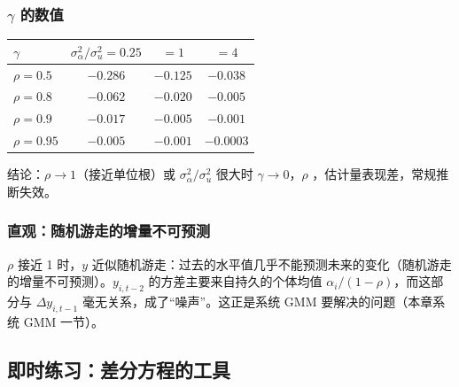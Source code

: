\subsubsection{\texorpdfstring{$\gamma$}{gamma} 的数值}

\begin{center}
\begin{minipage}{\linewidth}\centering\small
{}\label{tab:U12a-gamma}
\begin{tabular}{lccc}
\toprule
$\gamma$ & $\sigma_\alpha^2/\sigma_u^2=0.25$ & $=1$ & $=4$\\
\midrule
$\rho=0.5$  & $-0.286$ & $-0.125$ & $-0.038$\\
$\rho=0.8$  & $-0.062$ & $-0.020$ & $-0.005$\\
$\rho=0.9$  & $-0.017$ & $-0.005$ & $-0.001$\\
$\rho=0.95$ & $-0.005$ & $-0.001$ & $-0.0003$\\
\bottomrule
\end{tabular}
\end{minipage}
\end{center}

结论：$\rho\to1$（接近单位根）或 $\sigma_\alpha^2/\sigma_u^2$ 很大时 $\gamma\to0$，$\rho$ ，估计量表现差，常规推断失效。

\subsubsection{直观：随机游走的增量不可预测}

$\rho$ 接近 1 时，$y$ 近似随机游走：过去的水平值几乎不能预测未来的变化（随机游走的增量不可预测）。$y_{i,t-2}$ 的方差主要来自持久的个体均值 $\alpha_i/(1-\rho)$，而这部分与 $\Delta y_{i,t-1}$ 毫无关系，成了“噪声”。这正是系统 GMM 要解决的问题（本章系统 GMM 一节）。

\subsection{即时练习：差分方程的工具}

